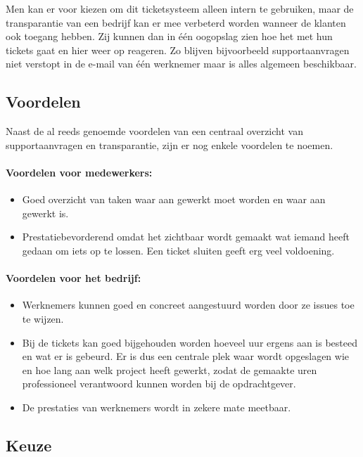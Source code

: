 Men kan er voor kiezen om dit ticketsysteem alleen intern te gebruiken, maar de transparantie van een bedrijf kan er mee verbeterd worden wanneer de klanten ook toegang hebben. Zij kunnen dan in één oogopslag zien hoe het met hun tickets gaat en hier weer op reageren. Zo blijven bijvoorbeeld supportaanvragen niet verstopt in de e-mail van één werknemer maar is alles algemeen beschikbaar. 

\subsection{Voordelen}

Naast de al reeds genoemde voordelen van een centraal overzicht van supportaanvragen en transparantie, zijn er nog enkele voordelen te noemen.

\paragraph{Voordelen voor medewerkers:}

\begin{itemize}
  \item Goed overzicht van taken waar aan gewerkt moet worden en waar aan gewerkt is.
  \item Prestatiebevorderend omdat het zichtbaar wordt gemaakt wat iemand heeft gedaan om iets op te lossen. Een ticket sluiten geeft erg veel voldoening.
\end{itemize}

\paragraph{Voordelen voor het bedrijf:}

\begin{itemize}
  \item Werknemers kunnen goed en concreet aangestuurd worden door ze issues toe te wijzen.
  \item Bij de tickets kan goed bijgehouden worden hoeveel uur ergens aan is besteed en wat er is gebeurd. Er is dus een centrale plek waar wordt opgeslagen wie en hoe lang aan welk project heeft gewerkt, zodat de gemaakte uren professioneel verantwoord kunnen worden bij de opdrachtgever.
  \item De prestaties van werknemers wordt in zekere mate meetbaar.
\end{itemize}

\subsection{Keuze}

